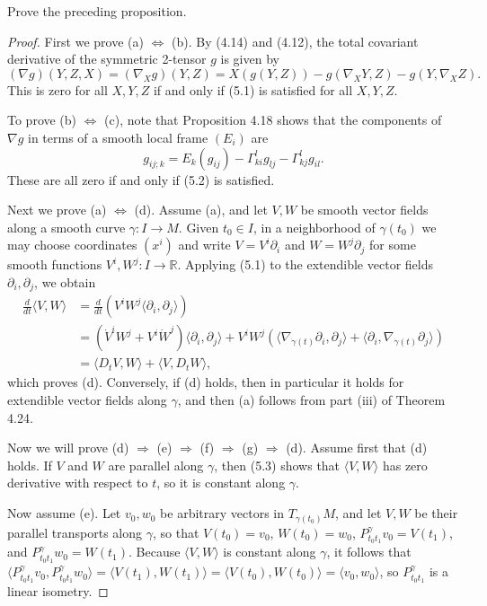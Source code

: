\begin{exercise}
\label{exer:prove-geodesic-pseudo-euclidean-submanifold}

Prove the preceding proposition.
\end{exercise}
\begin{proof}
First we prove (a) $\Leftrightarrow$ (b). By (4.14) and (4.12), the total covariant derivative of the symmetric 2-tensor $g$ is given by
\[
(\nabla g)(Y,Z,X) = (\nabla_X g)(Y,Z) = X(g(Y,Z)) - g(\nabla_X Y,Z) - g(Y,\nabla_X Z).
\]
This is zero for all $X,Y,Z$ if and only if (5.1) is satisfied for all $X,Y,Z$.

To prove (b) $\Leftrightarrow$ (c), note that Proposition 4.18 shows that the components of $\nabla g$ in terms of a smooth local frame $(E_i)$ are
\[
g_{ij;k} = E_k(g_{ij}) - \Gamma^l_{ki}g_{lj} - \Gamma^l_{kj}g_{il}.
\]
These are all zero if and only if (5.2) is satisfied.

Next we prove (a) $\Leftrightarrow$ (d). Assume (a), and let $V,W$ be smooth vector fields along a smooth curve $\gamma\colon I \to M$. Given $t_0 \in I$, in a neighborhood of $\gamma(t_0)$ we may choose coordinates $(x^i)$ and write $V = V^i\partial_i$ and $W = W^j\partial_j$ for some smooth functions $V^i, W^j\colon I \to \mathbb{R}$. Applying (5.1) to the extendible vector fields $\partial_i, \partial_j$, we obtain
\begin{align*}
\frac{d}{dt}\langle V,W\rangle &= \frac{d}{dt}\left(V^i W^j\langle\partial_i,\partial_j\rangle\right) \\
&= \left(\dot{V}^i W^j + V^i \dot{W}^j\right)\langle\partial_i,\partial_j\rangle + V^i W^j\left(\langle\nabla_{\dot{\gamma}(t)}\partial_i,\partial_j\rangle + \langle\partial_i,\nabla_{\dot{\gamma}(t)}\partial_j\rangle\right) \\
&= \langle D_t V, W\rangle + \langle V, D_t W\rangle,
\end{align*}
which proves (d). Conversely, if (d) holds, then in particular it holds for extendible vector fields along $\gamma$, and then (a) follows from part (iii) of Theorem 4.24.

Now we will prove (d) $\Rightarrow$ (e) $\Rightarrow$ (f) $\Rightarrow$ (g) $\Rightarrow$ (d). Assume first that (d) holds. If $V$ and $W$ are parallel along $\gamma$, then (5.3) shows that $\langle V,W\rangle$ has zero derivative with respect to $t$, so it is constant along $\gamma$.

Now assume (e). Let $v_0, w_0$ be arbitrary vectors in $T_{\gamma(t_0)}M$, and let $V, W$ be their parallel transports along $\gamma$, so that $V(t_0) = v_0$, $W(t_0) = w_0$, $P^{\gamma}_{t_0t_1} v_0 = V(t_1)$, and $P^{\gamma}_{t_0t_1} w_0 = W(t_1)$. Because $\langle V, W\rangle$ is constant along $\gamma$, it follows that $\langle P^{\gamma}_{t_0t_1} v_0, P^{\gamma}_{t_0t_1} w_0 \rangle = \langle V(t_1), W(t_1) \rangle = \langle V(t_0), W(t_0) \rangle = \langle v_0, w_0 \rangle$, so $P^{\gamma}_{t_0t_1}$ is a linear isometry.


\end{proof}
